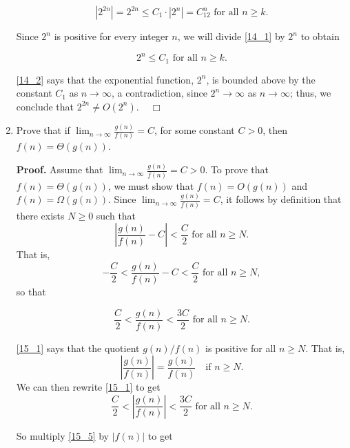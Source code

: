 \documentclass[9pt]{article}
\newcommand{\qed}{\hfill \ensuremath{\Box}}
\begin{document}
\begin{enumerate}
      \begin{equation} \label{14_1}
         |2^{2n}| = 2^{2n} \le C_1 \cdot |2^n| = C_12^n \text{ for all }
            n \ge k.
      \end{equation}

      Since $2^n$ is positive for every integer $n$, we will divide \eqref{14_1}
      by $2^n$ to obtain

      \begin{equation} \label{14_2}
         2^n \le C_1 \text{ for all } n \ge k.
      \end{equation}

      \eqref{14_2} says that the exponential function, $2^n$, is bounded above
      by the constant $C_1$ as $n \rightarrow \infty$, a contradiction, since
      $2^n \rightarrow \infty$ as $n \rightarrow \infty$; thus, we conclude that
      $2^{2n} \neq O(2^n)$. \mbox{ } \qed
   \item Prove that if $\lim_{n\rightarrow\infty}\frac{g(n)}{f(n)} = C$, for
         some constant $C > 0$, then $f(n) = \Theta(g(n))$.

      \textbf{Proof.} Assume that
      $\lim_{n\rightarrow\infty}\frac{g(n)}{f(n)} = C > 0$. To prove that
      $f(n) = \Theta(g(n))$, we must show that $f(n) = O(g(n))$ and
      $f(n) = \Omega(g(n))$. Since
      $\lim_{n\rightarrow\infty}\frac{g(n)}{f(n)} = C$, it follows by definition
      that there exists $N \ge 0$ such that
      $$\left|\frac{g(n)}{f(n)} - C\right| < \frac{C}{2} \text{ for all }
         n \ge N.$$
      That is,
      $$-\frac{C}{2} < \frac{g(n)}{f(n)} - C < \frac{C}{2} \text{ for all }
         n \ge N,$$
      so that

      \begin{equation} \label{15_1}
         \frac{C}{2} < \frac{g(n)}{f(n)} < \frac{3C}{2} \text{ for all }n \ge N.
      \end{equation}

      \eqref{15_1} says that the quotient $g(n)/f(n)$ is positive for all
      $n \ge N$. That is,
      $$\left|\frac{g(n)}{f(n)}\right| = \frac{g(n)}{f(n)} \quad
        \text{if }n \ge N.$$
      We can then rewrite \eqref{15_1} to get
      \begin{equation} \label{15_5}
         \frac{C}{2} < \left|\frac{g(n)}{f(n)}\right| < \frac{3C}{2}
         \text{ for all }n \ge N.
      \end{equation}

      So multiply \eqref{15_5} by $|f(n)|$ to get


\end{enumerate}
\end{document}
